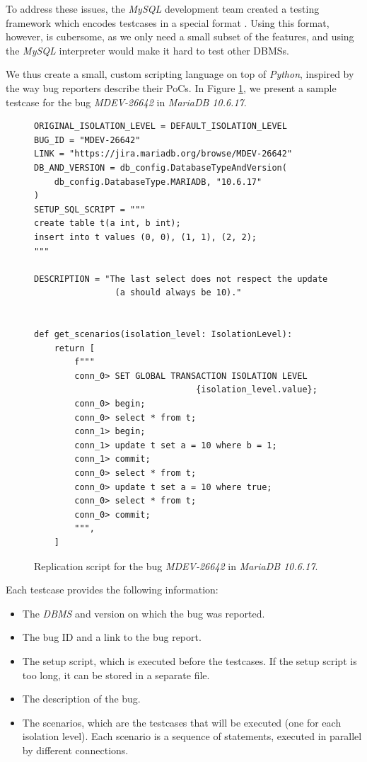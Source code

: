 To address these issues, the \textit{MySQL} development team created a testing framework which encodes testcases in a special format \cite{mysqltestrun}. Using this format, however, is cubersome, as we only need a small subset of the features, and using the \textit{MySQL} interpreter would make it hard to test other DBMSs. 

We thus create a small, custom scripting language on top of \textit{Python}, inspired by the way bug reporters describe their PoCs. In Figure \ref{fig:bug_metalanguage_sample}, we present a sample testcase for the bug \textit{MDEV-26642} in \textit{MariaDB 10.6.17}.

\begin{figure}
\begin{verbatim}
ORIGINAL_ISOLATION_LEVEL = DEFAULT_ISOLATION_LEVEL
BUG_ID = "MDEV-26642"
LINK = "https://jira.mariadb.org/browse/MDEV-26642"
DB_AND_VERSION = db_config.DatabaseTypeAndVersion(
    db_config.DatabaseType.MARIADB, "10.6.17"
)
SETUP_SQL_SCRIPT = """
create table t(a int, b int);
insert into t values (0, 0), (1, 1), (2, 2);
"""

DESCRIPTION = "The last select does not respect the update
                (a should always be 10)."


def get_scenarios(isolation_level: IsolationLevel):
    return [
        f"""
        conn_0> SET GLOBAL TRANSACTION ISOLATION LEVEL
                                {isolation_level.value};
        conn_0> begin;
        conn_0> select * from t;
        conn_1> begin;
        conn_1> update t set a = 10 where b = 1;
        conn_1> commit;
        conn_0> select * from t;
        conn_0> update t set a = 10 where true;
        conn_0> select * from t;
        conn_0> commit;
        """,
    ]
\end{verbatim}
\caption{Replication script for the bug \textit{MDEV-26642} in \textit{MariaDB 10.6.17}.} \label{fig:bug_metalanguage_sample}
\end{figure}

Each testcase provides the following information:
\begin{itemize}
    \item The \textit{DBMS} and version on which the bug was reported.
    \item The bug ID and a link to the bug report.
    \item The setup script, which is executed before the testcases. If the setup script is too long, it can be stored in a separate file.
    \item The description of the bug.
    \item The scenarios, which are the testcases that will be executed (one for each isolation level). Each scenario is a sequence of statements, executed in parallel by different connections.
\end{itemize}

